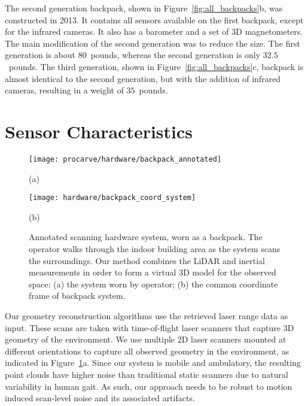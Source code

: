 \documentclass[12pt,onecolumn,oneside]{book}
\begin{document}
The second generation backpack, shown in Figure~\ref{fig:all_backpacks}b, was constructed in 2013.  It contains all sensors available on the first backpack, except for the infrared cameras.  It also has a barometer and a set of 3D magnetometers.  The main modification of the second generation was to reduce the size.  The first generation is about $80$~pounds, whereas the second generation is only $32.5$~pounds.  The third generation, shown in Figure~\ref{fig:all_backpacks}c, backpack is almost identical to the second generation, but with the addition of infrared cameras, resulting in a weight of $35$~pounds.

\section{Sensor Characteristics}
\label{sec:sensor_specs}

\begin{figure}[t]

	\begin{minipage}[c]{0.54\linewidth}
		\centerline{\texttt{[image: procarve/hardware/backpack\_annotated]}}
		\centerline{(a)}\medskip
	\end{minipage}
	\hfill
	\begin{minipage}[c]{0.46\linewidth}
		\centerline{\texttt{[image: hardware/backpack\_coord\_system]}}
		\centerline{(b)}\medskip
	\end{minipage}

	\caption[Annotated scanning hardware system.]{Annotated scanning hardware system, worn as a backpack.  The operator walks through the indoor building area as the system scans the surroundings.  Our method combines the LiDAR and inertial measurements in order to form a virtual 3D model for the observed space:  (a) the system worn by operator; (b) the common coordinate frame of backpack system.}
	\label{fig:backpack}
\end{figure}

Our geometry reconstruction algorithms use the retrieved laser range data as input.  These scans are taken with time-of-flight laser scanners that capture 3D geometry of the environment.  We use multiple 2D laser scanners mounted at different orientations to capture all observed geometry in the environment, as indicated in Figure~\ref{fig:backpack}a.  Since our system is mobile and ambulatory, the resulting point clouds have higher noise than traditional static scanners due to natural variability in human gait.  As such, our approach needs to be robust to motion induced scan-level noise and its associated artifacts.
\end{document}

